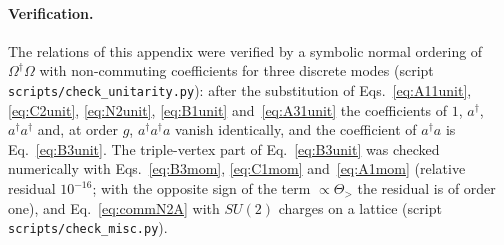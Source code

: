 \paragraph{Verification.} The relations of this appendix were verified by a symbolic normal ordering of $\Omega^\dagger\Omega$ with non-commuting coefficients for three discrete modes (script \texttt{scripts/check\_unitarity.py}): after the substitution of Eqs.~\eqref{eq:A11unit}, \eqref{eq:C2unit}, \eqref{eq:N2unit}, \eqref{eq:B1unit} and~\eqref{eq:A31unit} the coefficients of $1$, $a^\dagger$, $a^\dagger a^\dagger$ and, at order $g$, $a^\dagger a^\dagger a$ vanish identically, and the coefficient of $a^\dagger a$ is Eq.~\eqref{eq:B3unit}. The triple-vertex part of Eq.~\eqref{eq:B3unit} was checked numerically with Eqs.~\eqref{eq:B3mom}, \eqref{eq:C1mom} and~\eqref{eq:A1mom} (relative residual $10^{-16}$; with the opposite sign of the term $\propto\Theta_>$ the residual is of order one), and Eq.~\eqref{eq:commN2A} with $SU(2)$ charges on a lattice (script \texttt{scripts/check\_misc.py}).
